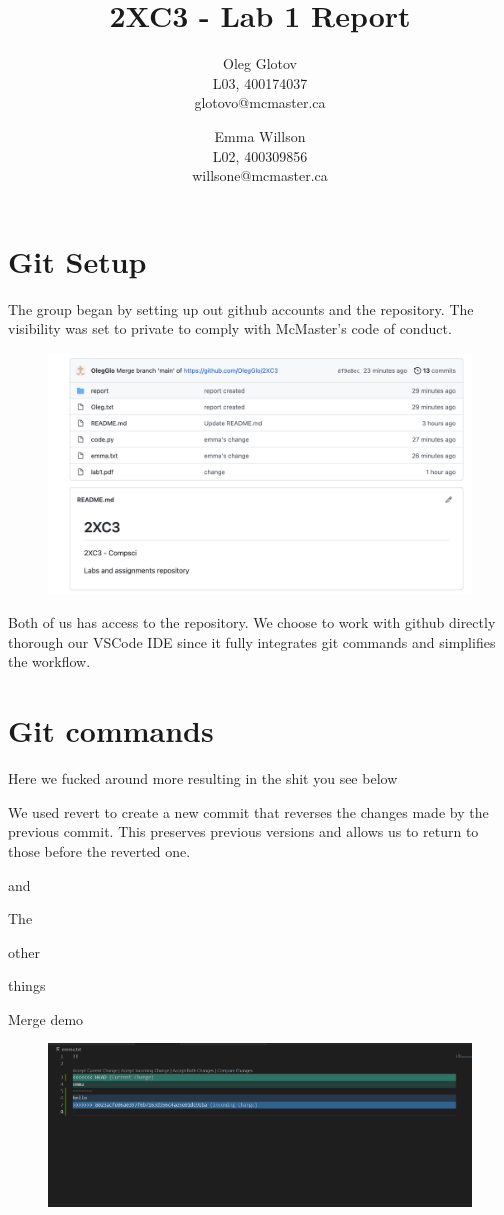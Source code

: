 \documentclass[twocolumn, 10pt]{article}
\title{2XC3 - Lab 1 Report}
\author{Oleg Glotov\\ L03, 400174037\\ glotovo@mcmaster.ca \and Emma Willson\\ L02, 400309856\\ willsone@mcmaster.ca}
\begin{document}
\maketitle
\section{Git Setup}\label{sec:git}
The group began by setting up out github accounts and the repository. The visibility was set to private to comply with McMaster's code of conduct.

\begin{figure}[H]
\includegraphics[width=\linewidth]{img1}
\end{figure}

Both of us has access to the repository. We choose to work with github directly thorough our VSCode IDE since it fully integrates git commands and simplifies the workflow.

\section{Git commands}

Here we fucked around more resulting in the shit you see below

We used revert to create a new commit that reverses the changes made by the previous commit. This preserves previous versions and allows us to return to those before the reverted one.  

and

The

other 

things

Merge demo

\begin{figure}[H]
\includegraphics[width=\linewidth]{merge}
\end{figure}
\end{document}
